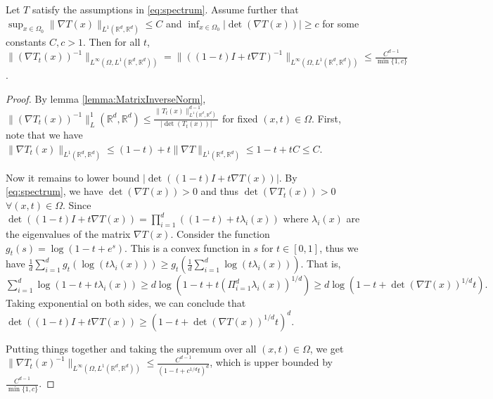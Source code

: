 \begin{lemma}\label{lemma:NormTtinverse}
Let $T$ satisfy the assumptions in \eqref{eq:spectrum}. Assume further that $\sup_{x\in\Omega_0}\|\nabla T(x)\|_{L^1(\mathbb{R}^d,\mathbb{R}^d)} \leq C$ and $\inf_{x\in\Omega_0}|\det(\nabla T(x))|\geq c$ for some constants $C,c > 1$.  Then for all $t$, $\|(\nabla T_t(x))^{-1}\|_{L^\infty(\Omega, L^1(\mathbb{R}^d,\mathbb{R}^d))} = \|((1-t)I + t\nabla T)^{-1}\|_{L^\infty(\Omega, L^1(\mathbb{R}^d,\mathbb{R}^d))} \leq \frac{C^{d-1}}{\min\{1, c\}}$.
\end{lemma}
\begin{proof}
By lemma \ref{lemma:MatrixInverseNorm}, $\|(\nabla T_t(x))^{-1}\|_L^1(\mathbb{R}^d,\mathbb{R}^d)\leq \frac{\|T_t(x)\|_{L^1(\mathbb{R}^d,\mathbb{R}^d)}^{d-1}}{|\det(T_t(x))|}$ for fixed $(x,t)\in\Omega$. First, note that we have $\|\nabla T_t(x)\|_{L^1(\mathbb{R}^d,\mathbb{R}^d)} \leq (1-t) + t\|\nabla T\|_{L^1(\mathbb{R}^d,\mathbb{R}^d)} \leq 1-t + tC \leq C$.

Now it remains to lower bound $|\det((1-t)I + t\nabla T(x))|$. By \eqref{eq:spectrum}, we have $\det(\nabla T(x)) > 0$ and thus $\det(\nabla T_t(x)) > 0$ $\forall (x,t)\in\Omega$. Since $\det((1-t)I + t\nabla T(x)) = \prod_{i=1}^d ((1-t) + t\lambda_i(x))$ where $\lambda_i(x)$ are the eigenvalues of the matrix $\nabla T(x)$. Consider the function $g_t(s) = \log(1-t+e^{s})$. This is a convex function in $s$ for $t\in[0,1]$, thus we have $\frac{1}{d} \sum_{i=1}^d g_t(\log (t\lambda_i(x))) \geq g_t(\frac{1}{d} \sum_{i=1}^d\log (t\lambda_i(x)))$. That is, $  \sum_{i=1}^d \log(1-t+t\lambda_i(x)) \geq  d \log(1-t + t(\Pi_{i=1}^d \lambda_i(x))^{1/d}) \geq d\log(1-t+\det(\nabla T(x))^{1/d}t).$ Taking exponential on both sides, we can conclude that $\det((1-t)I + t\nabla T(x)) \geq (1-t+\det(\nabla T(x))^{1/d}t)^d.$ 

Putting things together and taking the supremum over all $(x,t)\in\Omega$, we get $\|\nabla T_t(x)^{-1}\|_{L^\infty(\Omega,L^1(\mathbb{R}^d,\mathbb{R}^d))} \leq  \frac{C^{d-1}}{(1-t+c^{1/d}t)^d}$, which is upper bounded by $\frac{C^{d-1}}{\min\{1, c\}}$.


\end{proof}

